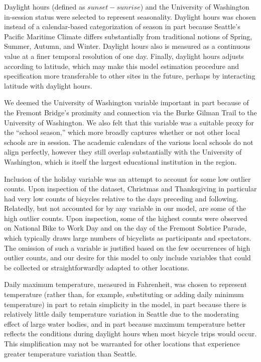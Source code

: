 \documentclass[12pt,letterpaper,article,twocolumn]{memoir}
\begin{document}
Daylight hours (defined as $sunset - sunrise$) and the University of
Washington in-session status were selected to represent seasonality.
Daylight hours was chosen instead of a calendar-based categorization
of season in part because Seattle's Pacific Maritime Climate differs
substantially from traditional notions of Spring, Summer, Autumn, and
Winter. Daylight hours also is measured as a continuous value at a
finer temporal resolution of one day. Finally, daylight hours adjusts
according to latitude, which may make this model estimation procedure
and specification more transferable to other sites in the future,
perhaps by interacting latitude with daylight hours.

We deemed the University of Washington variable important in part
because of the Fremont Bridge's proximity and connection via the Burke
Gilman Trail to the University of Washington. We also felt that this
variable was a suitable proxy for the ``school season,'' which more
broadly captures whether or not other local schools are in session.
The academic calendars of the various local schools do not align
perfectly, however they still overlap substantially with the
University of Washington, which is itself the largest educational
institution in the region.

Inclusion of the holiday variable was an attempt to account for
some low outlier counts. Upon inspection of the dataset, Christmas and
Thanksgiving in particular had very low counts of bicycles relative to
the days preceding and following. Relatedly, but not accounted for by
any variable in our model, are some of the high outlier counts. Upon
inspection, some of the highest counts were observed on National Bike
to Work Day and on the day of the Fremont Solstice Parade, which
typically draws large numbers of bicyclists as participants and
spectators. The omission of such a variable is justified based on the
few occurrences of high outlier counts, and our desire for this model
to only include variables that could be collected or straightforwardly
adapted to other locations.

Daily maximum temperature, measured in Fahrenheit, was chosen to
represent temperature (rather than, for example, substituting or
adding daily minimum temperature) in part to retain simplicity in the
model, in part because there is relatively little daily temperature
variation in Seattle due to the moderating effect of large water
bodies, and in part because maximum temperature better reflects the
conditions during daylight hours when most bicycle trips would occur.
This simplification may not be warranted for other locations that
experience greater temperature variation than Seattle.
\end{document}
